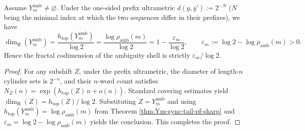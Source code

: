 \begin{corollary}[Fractal codimension calibrated by entropy gap: \texorpdfstring{$\mathrm{codim}=\varepsilon_m/\log 2$}{codim=eps/log2}]\label{cor:Ym-amb-codim-from-entropy-gap}
Assume \(Y_m^{\mathrm{amb}}\neq\varnothing\).
Under the one-sided prefix ultrametric
\(
d(y,y'):=2^{-N}
\)
(\(N\) being the minimal index at which the two sequences differ in their prefixes), we have
\[
\dim_{\mathrm H}(Y_m^{\mathrm{amb}})
=\frac{h_{\mathrm{top}}(Y_m^{\mathrm{amb}})}{\log 2}
=\frac{\log\rho_{\mathrm{amb}}(m)}{\log 2}
=1-\frac{\varepsilon_m}{\log 2},
\qquad
\varepsilon_m:=\log 2-\log\rho_{\mathrm{amb}}(m)>0.
\]
Hence the fractal codimension of the ambiguity shell is strictly \(\varepsilon_m/\log 2\).
\end{corollary}
\begin{proof}
For any subshift \(Z\), under the prefix ultrametric, the diameter of length-\(n\) cylinder sets is \(2^{-n}\), and their \(n\)-word count satisfies
\(
N_Z(n)=\exp(h_{\mathrm{top}}(Z)\,n+o(n))
\).
Standard covering estimates yield \(\dim_{\mathrm H}(Z)=h_{\mathrm{top}}(Z)/\log 2\).
Substituting \(Z=Y_m^{\mathrm{amb}}\) and using
\(
h_{\mathrm{top}}(Y_m^{\mathrm{amb}})=\log\rho_{\mathrm{amb}}(m)
\)
from Theorem \ref{thm:Ym-sync-tail-pf-sharp} and \(\varepsilon_m=\log 2-\log\rho_{\mathrm{amb}}(m)\) yields the conclusion. This completes the proof.
\end{proof}

